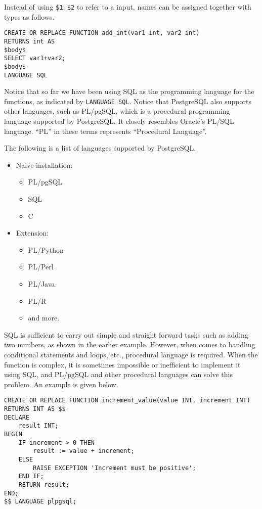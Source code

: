 Instead of using \verb|$1|, \verb|$2| to refer to a input, names can be assigned together with types as follows.
\begin{lstlisting}
CREATE OR REPLACE FUNCTION add_int(var1 int, var2 int)
RETURNS int AS
$body$
SELECT var1+var2;
$body$
LANGUAGE SQL
\end{lstlisting}

Notice that so far we have been using SQL as the programming language for the functions, as indicated by \verb|LANGUAGE SQL|. Notice that PostgreSQL also supports other languages, such as PL/pgSQL, which is a procedural programming language supported by PostgreSQL. It closely resembles Oracle's PL/SQL language. ``PL'' in these terms represents ``Procedural Language''.

The following is a list of languages supported by PostgreSQL.
\begin{itemize}
	\item Naive installation:
	\begin{itemize}
		\item PL/pgSQL
		\item SQL
		\item C
	\end{itemize}
	\item Extension:
	\begin{itemize}
		\item PL/Python
		\item PL/Perl
		\item PL/Java
		\item PL/R
		\item and more.
	\end{itemize}
\end{itemize}

SQL is sufficient to carry out simple and straight forward tasks such as adding two numbers, as shown in the earlier example. However, when comes to handling conditional statements and loops, etc., procedural language is required. When the function is complex, it is sometimes impossible or inefficient to implement it using SQL, and PL/pgSQL and other procedural languages can solve this problem. An example is given below.
\begin{lstlisting}
CREATE OR REPLACE FUNCTION increment_value(value INT, increment INT)
RETURNS INT AS $$
DECLARE
	result INT;
BEGIN
	IF increment > 0 THEN
		result := value + increment;
	ELSE
		RAISE EXCEPTION 'Increment must be positive';
	END IF;
	RETURN result;
END;
$$ LANGUAGE plpgsql;
\end{lstlisting}

